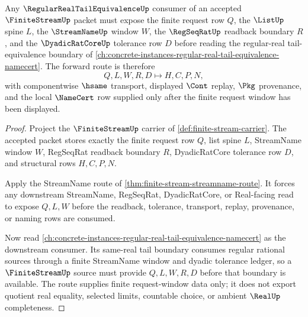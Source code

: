 \begin{theorem}
\label{thm:finite-stream-regular-real-tail-forward-route}
Any $\RegularRealTailEquivalenceUp$ consumer of an accepted $\FiniteStreamUp$ packet must expose the finite request row $Q$, the $\ListUp$ spine $L$, the $\StreamNameUp$ window $W$, the $\RegSeqRatUp$ readback boundary $R$, and the $\DyadicRatCoreUp$ tolerance row $D$ before reading the regular-real tail-equivalence boundary of \autoref{ch:concrete-instances-regular-real-tail-equivalence-namecert}. The forward route is therefore
$$
Q,L,W,R,D \longmapsto H,C,P,N,
$$
with componentwise $\hsame$ transport, displayed $\Cont$ replay, $\Pkg$ provenance, and the local $\NameCert$ row supplied only after the finite request window has been displayed.
\end{theorem}
\begin{proof}
Project the $\FiniteStreamUp$ carrier of \autoref{def:finite-stream-carrier}. The accepted packet stores exactly the finite request row $Q$, list spine $L$, StreamName window $W$, RegSeqRat readback boundary $R$, DyadicRatCore tolerance row $D$, and structural rows $H,C,P,N$.

Apply the StreamName route of \autoref{thm:finite-stream-streamname-route}. It forces any downstream StreamName, RegSeqRat, DyadicRatCore, or Real-facing read to expose $Q,L,W$ before the readback, tolerance, transport, replay, provenance, or naming rows are consumed.

Now read \autoref{ch:concrete-instances-regular-real-tail-equivalence-namecert} as the downstream consumer. Its same-real tail boundary consumes regular rational sources through a finite StreamName window and dyadic tolerance ledger, so a $\FiniteStreamUp$ source must provide $Q,L,W,R,D$ before that boundary is available. The route supplies finite request-window data only; it does not export quotient real equality, selected limits, countable choice, or ambient $\RealUp$ completeness.
\end{proof}
